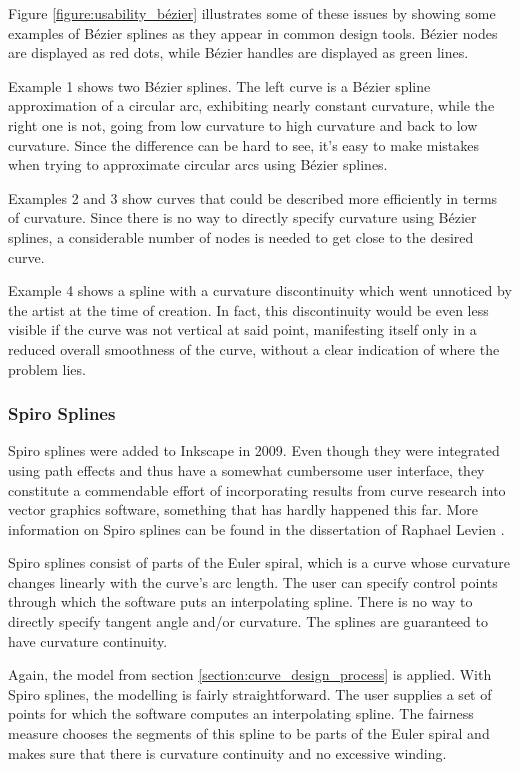 \documentclass[a4paper]{article}
\begin{document}
				Figure \ref{figure:usability_bézier} illustrates some of these issues by showing some examples of Bézier splines as they appear in common design tools. Bézier nodes are displayed as red dots, while Bézier handles are displayed as green lines.

				Example 1 shows two Bézier splines. The left curve is a Bézier spline approximation of a circular arc, exhibiting nearly constant curvature, while the right one is not, going from low curvature to high curvature and back to low curvature. Since the difference can be hard to see, it's easy to make mistakes when trying to approximate circular arcs using Bézier splines.

				Examples 2 and 3 show curves that could be described more efficiently in terms of curvature. Since there is no way to directly specify curvature using Bézier splines, a considerable number of nodes is needed to get close to the desired curve.

				Example 4 shows a spline with a curvature discontinuity which went unnoticed by the artist at the time of creation. In fact, this discontinuity would be even less visible if the curve was not vertical at said point, manifesting itself only in a reduced overall smoothness of the curve, without a clear indication of where the problem lies.

			\subsubsection{Spiro Splines}
			\label{section:spiro_splines}

				Spiro splines were added to Inkscape in 2009. Even though they were integrated using path effects and thus have a somewhat cumbersome user interface, they constitute a commendable effort of incorporating results from curve research into vector graphics software, something that has hardly happened this far. More information on Spiro splines can be found in the dissertation of Raphael Levien \cite{thesis-spiro}.

				Spiro splines consist of parts of the Euler spiral, which is a curve whose curvature changes linearly with the curve's arc length. The user can specify control points through which the software puts an interpolating spline. There is no way to directly specify tangent angle and/or curvature. The splines are guaranteed to have curvature continuity.

				Again, the model from section \ref{section:curve_design_process} is applied. With Spiro splines, the modelling is fairly straightforward. The user supplies a set of points for which the software computes an interpolating spline. The fairness measure chooses the segments of this spline to be parts of the Euler spiral and makes sure that there is curvature continuity and no excessive winding.
\end{document}
